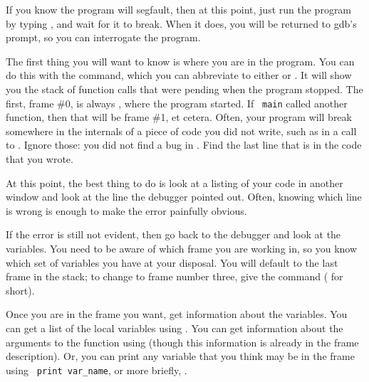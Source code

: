 \documentclass[12pt]{article}
\begin{document}
If you know the program will segfault, then at this point, just run the program
by typing , and wait for it to break. When it does, you will be
returned to gdb's prompt, so you can interrogate the program.




The first thing you will want to know is where you are in the program. You
can do this with the  command, which you can abbreviate to
either  or . It will show you the stack of function
calls that were pending when the program stopped.  The first, frame
\#0, is always , where the program started. If {\tt
main} called another function, then that will be frame \#1, et cetera.
Often, your program will break somewhere in the internals of a piece of
code you did not write, such as in a call to . Ignore those:
you did not find a bug in . Find the last line that is in
the code that you wrote.

At this point, the best thing to do is look at a listing of your code
in another window and look at the line the debugger pointed out. Often,
knowing which line is wrong is enough to make the error painfully obvious.

If the error is still not evident, then go back to the debugger and look
at the variables. You need to be aware of which frame you are working in,
so you know which set of variables you have at your disposal.  You
will default to the last frame in the stack; to change to frame number
three, give the command  ( for short).

Once you are in the frame you want, get information about the variables. You can
get a list of the local variables using . You can get
information about the arguments to the function using 
(though this information is already in the frame description). Or, you
can print any variable that you think may be in the frame using {\tt
print var\_name}, or more briefly, . 
\end{document}
